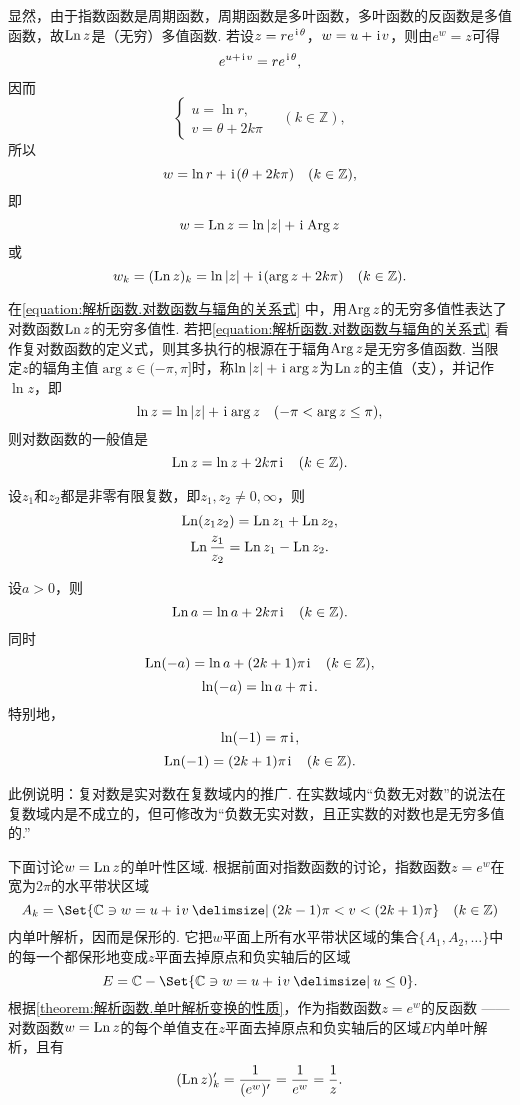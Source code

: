显然，由于指数函数是周期函数，周期函数是多叶函数，多叶函数的反函数是多值函数，故\(\operatorname{Ln} z\)是（无穷）多值函数.
若设\(z = r e^{\kern1pt\mathrm{i}\kern1pt\theta}\)，\(w = u + \kern1pt\mathrm{i}\kern1pt v\)，则由\(e^w = z\)可得\[
e^{u + \kern1pt\mathrm{i}\kern1pt v} = r e^{\kern1pt\mathrm{i}\kern1pt\theta},
\]因而\[
\left\{ \begin{array}{l}
u = \ln r, \\
v = \theta+2k\pi
\end{array} \right.
\quad(k\in\mathbb{Z}),
\]所以\[
w = \ln r + \kern1pt\mathrm{i}\kern1pt(\theta+2k\pi)
\quad(k\in\mathbb{Z}),
\]即\begin{equation}\label{equation:解析函数.对数函数与辐角的关系式}
w = \operatorname{Ln} z = \ln\abs{z} + \kern1pt\mathrm{i}\kern1pt \operatorname{Arg} z
\end{equation}或\[
w_k = (\operatorname{Ln} z)_k = \ln\abs{z} + \kern1pt\mathrm{i}\kern1pt(\arg z + 2k\pi)
\quad(k\in\mathbb{Z}).
\]

在\cref{equation:解析函数.对数函数与辐角的关系式} 中，用\(\operatorname{Arg} z\)的无穷多值性表达了对数函数\(\operatorname{Ln} z\)的无穷多值性.
若把\cref{equation:解析函数.对数函数与辐角的关系式} 看作复对数函数的定义式，则其多执行的根源在于辐角\(\operatorname{Arg} z\)是无穷多值函数.
当限定\(z\)的辐角主值\(\arg z \in (-\pi,\pi]\)时，称\(\ln\abs{z}+\kern1pt\mathrm{i}\kern1pt\arg z\)为\(\operatorname{Ln} z\)的主值（支），并记作\(\ln z\)，即\begin{equation}\label{equation:解析函数.对数函数的主值支}
\ln z = \ln\abs{z} + \kern1pt\mathrm{i}\kern1pt\arg z
\quad(-\pi < \arg z \leq \pi),
\end{equation}则对数函数的一般值是\[
\operatorname{Ln} z = \ln z + 2k\pi\kern1pt\mathrm{i}\kern1pt
\quad(k\in\mathbb{Z}).
\]

\begin{theorem}
设\(z_1\)和\(z_2\)都是非零有限复数，即\(z_1,z_2\neq0,\infty\)，则\begin{gather}
\operatorname{Ln}(z_1 z_2) = \operatorname{Ln} z_1 + \operatorname{Ln} z_2, \\
\operatorname{Ln} \frac{z_1}{z_2} = \operatorname{Ln} z_1 - \operatorname{Ln} z_2.
\end{gather}
\end{theorem}

\begin{example}
设\(a > 0\)，则\[
\operatorname{Ln} a = \ln a + 2k\pi\kern1pt\mathrm{i}\kern1pt \quad(k\in\mathbb{Z}).
\]同时\[
\operatorname{Ln}(-a) = \ln a + (2k+1)\pi\kern1pt\mathrm{i}\kern1pt \quad(k\in\mathbb{Z}),
\]\[
\ln(-a) = \ln a + \pi\kern1pt\mathrm{i}\kern1pt.
\]特别地，\[
\ln(-1) = \pi\kern1pt\mathrm{i}\kern1pt,
\]\[
\operatorname{Ln}(-1) = (2k+1)\pi\kern1pt\mathrm{i}\kern1pt \quad(k\in\mathbb{Z}).
\]
\end{example}
此例说明：复对数是实对数在复数域内的推广.
在实数域内“负数无对数”的说法在复数域内是不成立的，但可修改为“负数无实对数，且正实数的对数也是无穷多值的.”

下面讨论\(w = \operatorname{Ln} z\)的单叶性区域.
根据前面对指数函数的讨论，指数函数\(z = e^w\)在宽为\(2\pi\)的水平带状区域\[
A_k = \Set{ \mathbb{C} \ni w = u + \iu v \given (2k-1)\pi < v < (2k+1)\pi }
\quad(k\in\mathbb{Z})
\]内单叶解析，因而是保形的.
它把\(w\)平面上所有水平带状区域的集合\(\{A_1,A_2,\dotsc\}\)中的每一个都保形地变成\(z\)平面去掉原点和负实轴后的区域\[
E = \mathbb{C} - \Set{ \mathbb{C} \ni w = u + \iu v \given u \leq 0 }.
\]
根据\cref{theorem:解析函数.单叶解析变换的性质}，作为指数函数\(z = e^w\)的反函数 —— 对数函数\(w = \operatorname{Ln} z\)的每个单值支在\(z\)平面去掉原点和负实轴后的区域\(E\)内单叶解析，且有\begin{equation}
(\operatorname{Ln} z)'_k = \frac{1}{(e^w)'} = \frac{1}{e^w} = \frac{1}{z}.
\end{equation}

